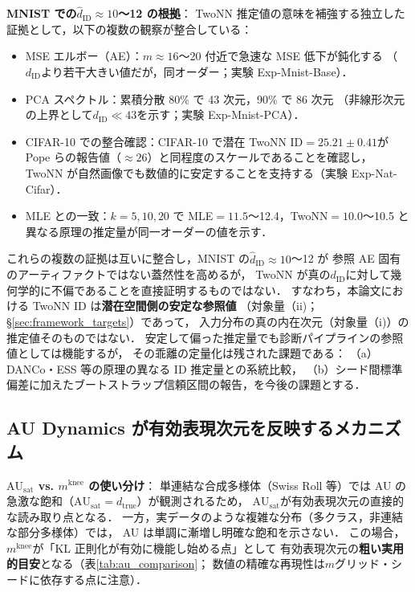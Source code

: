 \documentclass[11pt,a4paper]{jsarticle}
\newcommand{\dtrue}{d_{\mathrm{true}}}
\newcommand{\AUsat}{\mathrm{AU}_{\mathrm{sat}}}
\newcommand{\mknee}{m^{\mathrm{knee}}}
\begin{document}
\textbf{MNIST での$\hat{d}_\mathrm{ID} \approx 10$〜12 の根拠}：
TwoNN 推定値の意味を補強する独立した証拠として，以下の複数の観察が整合している：
\begin{itemize}
  \item MSE エルボー（AE）：$m \approx 16$〜20 付近で急速な MSE 低下が鈍化する
        （$d_\mathrm{ID}$より若干大きい値だが，同オーダー；実験 Exp-Mnist-Base）．
  \item PCA スペクトル：累積分散 80\% で 43 次元，90\% で 86 次元
        （非線形次元の上界として$d_\mathrm{ID} \ll 43$を示す；実験 Exp-Mnist-PCA）．
  \item CIFAR-10 での整合確認：CIFAR-10 で潜在 TwoNN ID$=25.21\pm0.41$が
        Pope ら\cite{pope2021intrinsic}の報告値（$\approx26$）と同程度のスケールであることを確認し，
        TwoNN が自然画像でも数値的に安定することを支持する（実験 Exp-Nat-Cifar）．
  \item MLE との一致：$k=5,10,20$ で MLE$=11.5$〜12.4，TwoNN$=10.0$〜10.5 と
        異なる原理の推定量が同一オーダーの値を示す．
\end{itemize}
これらの複数の証拠は互いに整合し，MNIST の$\hat{d}_\mathrm{ID} \approx 10$〜12 が
参照 AE 固有のアーティファクトではない蓋然性を高めるが，
TwoNN が真の$d_\mathrm{ID}$に対して幾何学的に不偏であることを直接証明するものではない．
すなわち，本論文における TwoNN ID は\textbf{潜在空間側の安定な参照値}
（対象量（ii)；§\ref{sec:framework_targets}）であって，
入力分布の真の内在次元（対象量（i)）の推定値そのものではない．
安定して偏った推定量でも診断パイプラインの参照値としては機能するが，
その乖離の定量化は残された課題である：
（a）DANCo\cite{ceruti2014danco}・ESS 等の原理の異なる ID 推定量との系統比較，
（b）シード間標準偏差に加えたブートストラップ信頼区間の報告，を今後の課題とする．

\subsection{AU Dynamics が有効表現次元を反映するメカニズム}\label{sec:disc_au_dynamics}

\textbf{$\AUsat$ vs. $\mknee$ の使い分け}：
単連結な合成多様体（Swiss Roll 等）では AU の急激な飽和（$\AUsat = \dtrue$）が観測されるため，
$\AUsat$が有効表現次元の直接的な読み取り点となる．
一方，実データのような複雑な分布（多クラス，非連結な部分多様体）では，
AU は単調に漸増し明確な飽和を示さない．
この場合，$\mknee$が「KL 正則化が有効に機能し始める点」として
有効表現次元の\textbf{粗い実用的目安}となる（表\ref{tab:au_comparison}；
数値の精確な再現性は$m$グリッド・シードに依存する点に注意）．
\end{document}
